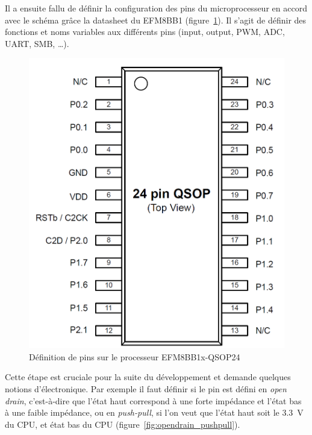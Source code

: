 \documentclass[a4paper, 12pt, sffamily]{report}
\begin{document}
Il a ensuite fallu de définir la configuration des pins du microprocesseur en accord avec le schéma grâce la datasheet du EFM8BB1 (figure~\ref{fig:pins_definition}). Il s’agit de définir des fonctions et noms variables aux différents pins (input, output, PWM, ADC, UART, SMB, …).

\begin{figure}[H]
\centering
\includegraphics[scale=0.4]{figures/screenshots/pins_definition_EFM8BB.png}
\caption{Définition de pins sur le processeur EFM8BB1x-QSOP24\cite{EFM8BB1_datasheet}}
\label{fig:pins_definition}
\end{figure}

Cette étape est cruciale pour la suite du développement et demande quelques notions d’électronique. Par exemple il faut définir si le pin est défini en \emph{open drain}, c’est-à-dire que l’état haut correspond à une forte impédance et l’état bas à une faible impédance, ou en \emph{push-pull}, si l’on veut que l’état haut soit le \SI{3.3}{\volt} du CPU, et état bas du CPU (figure~\ref{fig:opendrain_pushpull}). 
\end{document}
